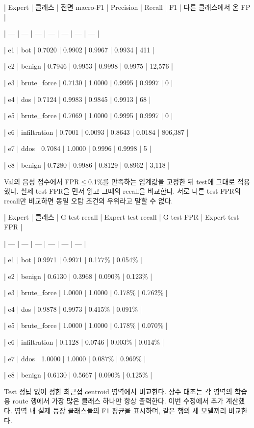 | Expert | 클래스 | 전면 macro-F1 | Precision | Recall | F1 | 다른 클래스에서 온 FP |

| --- | --- | --- | --- | --- | --- | --- |

| e1 | bot | 0.7020 | 0.9902 | 0.9967 | 0.9934 | 411 |

| e2 | benign | 0.7946 | 0.9953 | 0.9998 | 0.9975 | 12,576 |

| e3 | brute\_\allowbreak{}force | 0.7130 | 1.0000 | 0.9995 | 0.9997 | 0 |

| e4 | dos | 0.7124 | 0.9983 | 0.9845 | 0.9913 | 68 |

| e5 | brute\_\allowbreak{}force | 0.7069 | 1.0000 | 0.9995 | 0.9997 | 0 |

| e6 | infiltration | 0.7001 | 0.0093 | 0.8643 | 0.0184 | 806,387 |

| e7 | ddos | 0.7084 | 1.0000 | 0.9996 | 0.9998 | 5 |

| e8 | benign | 0.7280 | 0.9986 | 0.8129 | 0.8962 | 3,118 |

Val의 음성 점수에서 FPR\ensuremath{\leq}0.1\%를 만족하는 임계값을 고정한 뒤 test에 그대로 적용했다. 실제 test FPR을 먼저 읽고 그때의 recall을 비교한다. 서로 다른 test FPR의 recall만 비교하면 동일 오탐 조건의 우위라고 말할 수 없다.

| Expert | 클래스 | G test recall | Expert test recall | G test FPR | Expert test FPR |

| --- | --- | --- | --- | --- | --- |

| e1 | bot | 0.9971 | 0.9971 | 0.177\% | 0.054\% |

| e2 | benign | 0.6130 | 0.3968 | 0.090\% | 0.123\% |

| e3 | brute\_\allowbreak{}force | 1.0000 | 1.0000 | 0.178\% | 0.762\% |

| e4 | dos | 0.9878 | 0.9973 | 0.415\% | 0.091\% |

| e5 | brute\_\allowbreak{}force | 1.0000 | 1.0000 | 0.178\% | 0.070\% |

| e6 | infiltration | 0.1128 | 0.0746 | 0.003\% | 0.014\% |

| e7 | ddos | 1.0000 | 1.0000 | 0.087\% | 0.969\% |

| e8 | benign | 0.6130 | 0.5667 | 0.090\% | 0.125\% |

Test 정답 없이 정한 최근접 centroid 영역에서 비교한다. 상수 대조는 각 영역의 학습용 route 행에서 가장 많은 클래스 하나만 항상 출력한다. 이번 수정에서 추가 계산했다. 영역 내 실제 등장 클래스들의 F1 평균을 표시하며, 같은 행의 세 모델끼리 비교한다.

